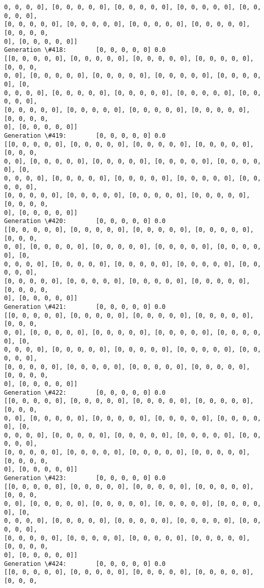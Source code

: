 \documentclass[11pt]{article}
\begin{document}
\begin{Verbatim}[commandchars=\\\{\}]
0, 0, 0, 0], [0, 0, 0, 0, 0], [0, 0, 0, 0, 0], [0, 0, 0, 0, 0], [0, 0, 0, 0, 0],
[0, 0, 0, 0, 0], [0, 0, 0, 0, 0], [0, 0, 0, 0, 0], [0, 0, 0, 0, 0], [0, 0, 0, 0,
0], [0, 0, 0, 0, 0]]
Generation \#418:        [0, 0, 0, 0, 0] 0.0
[[0, 0, 0, 0, 0], [0, 0, 0, 0, 0], [0, 0, 0, 0, 0], [0, 0, 0, 0, 0], [0, 0, 0,
0, 0], [0, 0, 0, 0, 0], [0, 0, 0, 0, 0], [0, 0, 0, 0, 0], [0, 0, 0, 0, 0], [0,
0, 0, 0, 0], [0, 0, 0, 0, 0], [0, 0, 0, 0, 0], [0, 0, 0, 0, 0], [0, 0, 0, 0, 0],
[0, 0, 0, 0, 0], [0, 0, 0, 0, 0], [0, 0, 0, 0, 0], [0, 0, 0, 0, 0], [0, 0, 0, 0,
0], [0, 0, 0, 0, 0]]
Generation \#419:        [0, 0, 0, 0, 0] 0.0
[[0, 0, 0, 0, 0], [0, 0, 0, 0, 0], [0, 0, 0, 0, 0], [0, 0, 0, 0, 0], [0, 0, 0,
0, 0], [0, 0, 0, 0, 0], [0, 0, 0, 0, 0], [0, 0, 0, 0, 0], [0, 0, 0, 0, 0], [0,
0, 0, 0, 0], [0, 0, 0, 0, 0], [0, 0, 0, 0, 0], [0, 0, 0, 0, 0], [0, 0, 0, 0, 0],
[0, 0, 0, 0, 0], [0, 0, 0, 0, 0], [0, 0, 0, 0, 0], [0, 0, 0, 0, 0], [0, 0, 0, 0,
0], [0, 0, 0, 0, 0]]
Generation \#420:        [0, 0, 0, 0, 0] 0.0
[[0, 0, 0, 0, 0], [0, 0, 0, 0, 0], [0, 0, 0, 0, 0], [0, 0, 0, 0, 0], [0, 0, 0,
0, 0], [0, 0, 0, 0, 0], [0, 0, 0, 0, 0], [0, 0, 0, 0, 0], [0, 0, 0, 0, 0], [0,
0, 0, 0, 0], [0, 0, 0, 0, 0], [0, 0, 0, 0, 0], [0, 0, 0, 0, 0], [0, 0, 0, 0, 0],
[0, 0, 0, 0, 0], [0, 0, 0, 0, 0], [0, 0, 0, 0, 0], [0, 0, 0, 0, 0], [0, 0, 0, 0,
0], [0, 0, 0, 0, 0]]
Generation \#421:        [0, 0, 0, 0, 0] 0.0
[[0, 0, 0, 0, 0], [0, 0, 0, 0, 0], [0, 0, 0, 0, 0], [0, 0, 0, 0, 0], [0, 0, 0,
0, 0], [0, 0, 0, 0, 0], [0, 0, 0, 0, 0], [0, 0, 0, 0, 0], [0, 0, 0, 0, 0], [0,
0, 0, 0, 0], [0, 0, 0, 0, 0], [0, 0, 0, 0, 0], [0, 0, 0, 0, 0], [0, 0, 0, 0, 0],
[0, 0, 0, 0, 0], [0, 0, 0, 0, 0], [0, 0, 0, 0, 0], [0, 0, 0, 0, 0], [0, 0, 0, 0,
0], [0, 0, 0, 0, 0]]
Generation \#422:        [0, 0, 0, 0, 0] 0.0
[[0, 0, 0, 0, 0], [0, 0, 0, 0, 0], [0, 0, 0, 0, 0], [0, 0, 0, 0, 0], [0, 0, 0,
0, 0], [0, 0, 0, 0, 0], [0, 0, 0, 0, 0], [0, 0, 0, 0, 0], [0, 0, 0, 0, 0], [0,
0, 0, 0, 0], [0, 0, 0, 0, 0], [0, 0, 0, 0, 0], [0, 0, 0, 0, 0], [0, 0, 0, 0, 0],
[0, 0, 0, 0, 0], [0, 0, 0, 0, 0], [0, 0, 0, 0, 0], [0, 0, 0, 0, 0], [0, 0, 0, 0,
0], [0, 0, 0, 0, 0]]
Generation \#423:        [0, 0, 0, 0, 0] 0.0
[[0, 0, 0, 0, 0], [0, 0, 0, 0, 0], [0, 0, 0, 0, 0], [0, 0, 0, 0, 0], [0, 0, 0,
0, 0], [0, 0, 0, 0, 0], [0, 0, 0, 0, 0], [0, 0, 0, 0, 0], [0, 0, 0, 0, 0], [0,
0, 0, 0, 0], [0, 0, 0, 0, 0], [0, 0, 0, 0, 0], [0, 0, 0, 0, 0], [0, 0, 0, 0, 0],
[0, 0, 0, 0, 0], [0, 0, 0, 0, 0], [0, 0, 0, 0, 0], [0, 0, 0, 0, 0], [0, 0, 0, 0,
0], [0, 0, 0, 0, 0]]
Generation \#424:        [0, 0, 0, 0, 0] 0.0
[[0, 0, 0, 0, 0], [0, 0, 0, 0, 0], [0, 0, 0, 0, 0], [0, 0, 0, 0, 0], [0, 0, 0,

\end{Verbatim}
\end{document}
